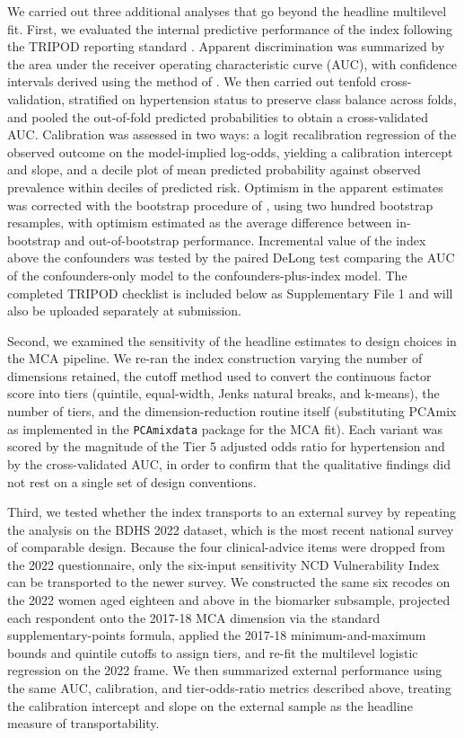 \documentclass[
  12pt,
  a4paper]{article}
\begin{document}
We carried out three additional analyses that go beyond the headline multilevel fit. First, we evaluated the internal predictive performance of the index following the TRIPOD reporting standard \citep{moons_tripod_2015}. Apparent discrimination was summarized by the area under the receiver operating characteristic curve (AUC), with confidence intervals derived using the method of \citet{delong_areas_1988}. We then carried out tenfold cross-validation, stratified on hypertension status to preserve class balance across folds, and pooled the out-of-fold predicted probabilities to obtain a cross-validated AUC. Calibration was assessed in two ways: a logit recalibration regression of the observed outcome on the model-implied log-odds, yielding a calibration intercept and slope, and a decile plot of mean predicted probability against observed prevalence within deciles of predicted risk. Optimism in the apparent estimates was corrected with the bootstrap procedure of \citet{harrell_regression_2015}, using two hundred bootstrap resamples, with optimism estimated as the average difference between in-bootstrap and out-of-bootstrap performance. Incremental value of the index above the confounders was tested by the paired DeLong test comparing the AUC of the confounders-only model to the confounders-plus-index model. The completed TRIPOD checklist is included below as Supplementary File 1 and will also be uploaded separately at submission.

Second, we examined the sensitivity of the headline estimates to design choices in the MCA pipeline. We re-ran the index construction varying the number of dimensions retained, the cutoff method used to convert the continuous factor score into tiers (quintile, equal-width, Jenks natural breaks, and k-means), the number of tiers, and the dimension-reduction routine itself (substituting PCAmix as implemented in the \texttt{PCAmixdata} package for the MCA fit). Each variant was scored by the magnitude of the Tier 5 adjusted odds ratio for hypertension and by the cross-validated AUC, in order to confirm that the qualitative findings did not rest on a single set of design conventions.

Third, we tested whether the index transports to an external survey by repeating the analysis on the BDHS 2022 dataset, which is the most recent national survey of comparable design. Because the four clinical-advice items were dropped from the 2022 questionnaire, only the six-input sensitivity NCD Vulnerability Index can be transported to the newer survey. We constructed the same six recodes on the 2022 women aged eighteen and above in the biomarker subsample, projected each respondent onto the 2017-18 MCA dimension via the standard supplementary-points formula, applied the 2017-18 minimum-and-maximum bounds and quintile cutoffs to assign tiers, and re-fit the multilevel logistic regression on the 2022 frame. We then summarized external performance using the same AUC, calibration, and tier-odds-ratio metrics described above, treating the calibration intercept and slope on the external sample as the headline measure of transportability.
\end{document}
